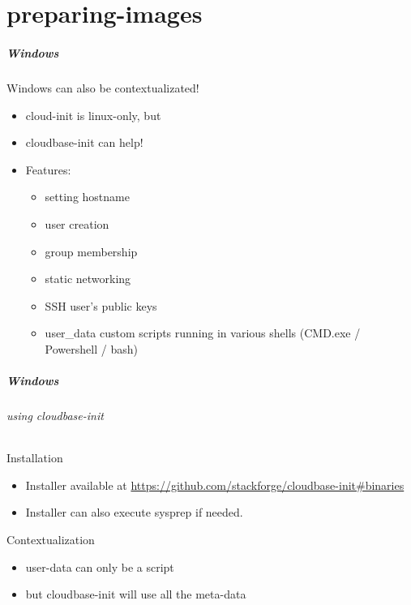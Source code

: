 \part{preparing-images}

\begin{frame}
  \frametitle{Windows}

  \begin{block}{Windows can also be contextualizated!}
  \begin{itemize}
    \item cloud-init is linux-only, but
    \item cloudbase-init can help!
    \item Features:
    \begin{itemize}
        \item setting hostname 
        \item user creation
        \item group membership
        \item static networking
        \item SSH user's public keys
        \item user\_data custom scripts running in various shells (CMD.exe / Powershell / bash)
    \end{itemize}
  \end{itemize}
  \end{block}
\end{frame}



\begin{frame}
  \frametitle{Windows}
  \framesubtitle{using cloudbase-init}
    
  \begin{block}{Installation}
    \begin{itemize}
        \item Installer available at \url{https://github.com/stackforge/cloudbase-init\#binaries}
        \item Installer can also execute sysprep if needed.
    \end{itemize}
  \end{block}

  \begin{block}{Contextualization}
    \begin{itemize}
        \item user-data can only be a script 
        \item but cloudbase-init will use all the meta-data 
    \end{itemize}
  \end{block}

\end{frame}

